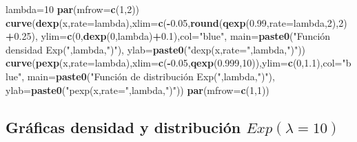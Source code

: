 \documentclass[]{book}
\newenvironment{Shaded}{\begin{snugshade}}{\end{snugshade}}
\newcommand{\DataTypeTok}[1]{\textcolor[rgb]{0.13,0.29,0.53}{#1}}
\newcommand{\DecValTok}[1]{\textcolor[rgb]{0.00,0.00,0.81}{#1}}
\newcommand{\FloatTok}[1]{\textcolor[rgb]{0.00,0.00,0.81}{#1}}
\newcommand{\KeywordTok}[1]{\textcolor[rgb]{0.13,0.29,0.53}{\textbf{#1}}}
\newcommand{\NormalTok}[1]{#1}
\newcommand{\OperatorTok}[1]{\textcolor[rgb]{0.81,0.36,0.00}{\textbf{#1}}}
\newcommand{\StringTok}[1]{\textcolor[rgb]{0.31,0.60,0.02}{#1}}
\begin{document}
\begin{Shaded}
\begin{Highlighting}[]
\NormalTok{lambda=}\DecValTok{10}
\KeywordTok{par}\NormalTok{(}\DataTypeTok{mfrow=}\KeywordTok{c}\NormalTok{(}\DecValTok{1}\NormalTok{,}\DecValTok{2}\NormalTok{))}
\KeywordTok{curve}\NormalTok{(}\KeywordTok{dexp}\NormalTok{(x,}\DataTypeTok{rate=}\NormalTok{lambda),}\DataTypeTok{xlim=}\KeywordTok{c}\NormalTok{(}\OperatorTok{-}\FloatTok{0.05}\NormalTok{,}\KeywordTok{round}\NormalTok{(}\KeywordTok{qexp}\NormalTok{(}\FloatTok{0.99}\NormalTok{,}\DataTypeTok{rate=}\NormalTok{lambda,}\DecValTok{2}\NormalTok{),}\DecValTok{2}\NormalTok{)}\OperatorTok{+}\FloatTok{0.25}\NormalTok{),}
      \DataTypeTok{ylim=}\KeywordTok{c}\NormalTok{(}\DecValTok{0}\NormalTok{,}\KeywordTok{dexp}\NormalTok{(}\DecValTok{0}\NormalTok{,lambda)}\OperatorTok{+}\FloatTok{0.1}\NormalTok{),}\DataTypeTok{col=}\StringTok{"blue"}\NormalTok{,}
      \DataTypeTok{main=}\KeywordTok{paste0}\NormalTok{(}\StringTok{"Función densidad Exp("}\NormalTok{,lambda,}\StringTok{")"}\NormalTok{),}
      \DataTypeTok{ylab=}\KeywordTok{paste0}\NormalTok{(}\StringTok{"dexp(x,rate="}\NormalTok{,lambda,}\StringTok{")"}\NormalTok{))}
\KeywordTok{curve}\NormalTok{(}\KeywordTok{pexp}\NormalTok{(x,}\DataTypeTok{rate=}\NormalTok{lambda),}\DataTypeTok{xlim=}\KeywordTok{c}\NormalTok{(}\OperatorTok{-}\FloatTok{0.05}\NormalTok{,}\KeywordTok{qexp}\NormalTok{(}\FloatTok{0.999}\NormalTok{,}\DecValTok{10}\NormalTok{)),}\DataTypeTok{ylim=}\KeywordTok{c}\NormalTok{(}\DecValTok{0}\NormalTok{,}\FloatTok{1.1}\NormalTok{),}\DataTypeTok{col=}\StringTok{"blue"}\NormalTok{,}
      \DataTypeTok{main=}\KeywordTok{paste0}\NormalTok{(}\StringTok{"Función de distribución Exp("}\NormalTok{,lambda,}\StringTok{")"}\NormalTok{),}
      \DataTypeTok{ylab=}\KeywordTok{paste0}\NormalTok{(}\StringTok{"pexp(x,rate="}\NormalTok{,lambda,}\StringTok{")"}\NormalTok{))}
\KeywordTok{par}\NormalTok{(}\DataTypeTok{mfrow=}\KeywordTok{c}\NormalTok{(}\DecValTok{1}\NormalTok{,}\DecValTok{1}\NormalTok{))}
\end{Highlighting}
\end{Shaded}

\hypertarget{gruxe1ficas-densidad-y-distribuciuxf3n-explambda10-1}{%
\subsection{\texorpdfstring{Gráficas densidad y distribución \(Exp(\lambda=10)\)}{Gráficas densidad y distribución Exp(\textbackslash{}lambda=10)}}\label{gruxe1ficas-densidad-y-distribuciuxf3n-explambda10-1}}
\end{document}
